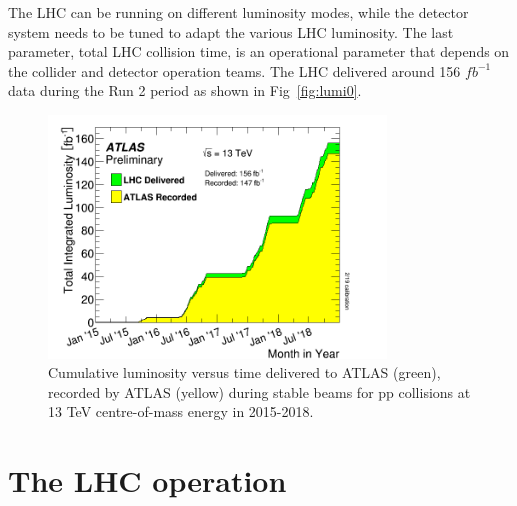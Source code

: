 \par The LHC can be running on different luminosity modes, while the detector system needs to be tuned to adapt the various LHC luminosity. The last parameter, total LHC collision time, is an operational parameter that depends on the collider and detector operation teams. The LHC delivered around 156 $fb^{-1}$ data during the Run 2 period as shown in Fig~\ref{fig:lumi0}.
\begin{figure}[htbp]
 \begin{center}
  \includegraphics[width=0.8\textwidth]{chapters/c4/figures/intlumivstimeRun2}
 \end{center}
    \caption{Cumulative luminosity versus time delivered to ATLAS (green), recorded by ATLAS (yellow) during stable beams for pp collisions at 13 TeV centre-of-mass energy in 2015-2018.} 
 \label{fig:lumi}
\end{figure}

\section{The LHC operation}
\label{sec:lhcs1}

